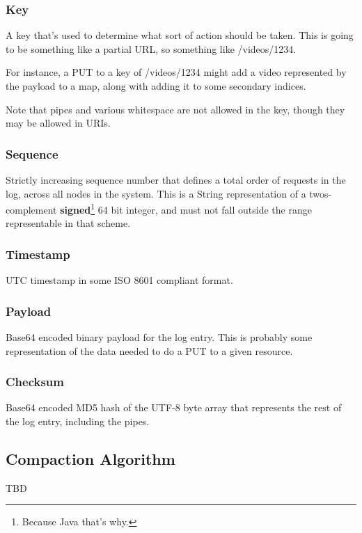 \subsubsection{Key}
A key that’s used to determine what sort of action should be taken.  This is going to be something like a partial URL, so something like /videos/1234.

For instance, a PUT to a key of /videos/1234 might add a video represented by the payload to a map, along with adding it to some secondary indices.  

Note that pipes and various whitespace are not allowed in the key, though they may be allowed in URIs.

\subsubsection{Sequence}
Strictly increasing sequence number that defines a total order of requests in the log, across all nodes in the system.  This is a String representation of a twos-complement \textbf{signed}\footnote{Because Java that’s why.} 64 bit integer, and must not fall outside the range representable in that scheme.

\subsubsection{Timestamp}
UTC timestamp in some ISO 8601 compliant format.

\subsubsection{Payload}
Base64 encoded binary payload for the log entry.  This is probably some representation of the data needed to do a PUT to a given resource.

\subsubsection{Checksum}
Base64 encoded MD5 hash of the UTF-8 byte array that represents the rest of the log entry, including the pipes.


\subsection{Compaction Algorithm}
TBD



